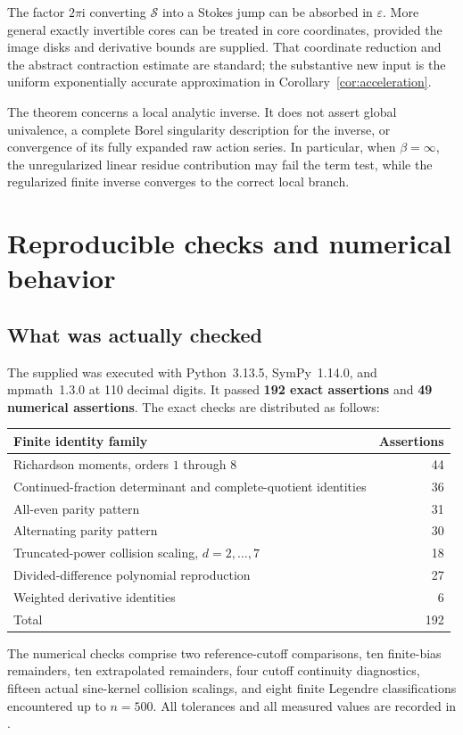 \documentclass[11pt,a4paper]{article}
\numberwithin{equation}{section}
\theoremstyle{definition}
\theoremstyle{remark}
\newcommand{\ii}{\mathrm i}
\newcommand{\Ssum}{\mathcal S}
\begin{document}
The factor $2\pi\ii$ converting $\Ssum$ into a Stokes jump can be
absorbed in $\varepsilon$. More general exactly invertible cores can
be treated in core coordinates, provided the image disks and derivative
bounds are supplied. That coordinate reduction and the abstract
contraction estimate are standard; the substantive new input is the
uniform exponentially accurate approximation in
Corollary~\ref{cor:acceleration}.

The theorem concerns a local analytic inverse. It does not assert global
univalence, a complete Borel singularity description for the inverse,
or convergence of its fully expanded raw action series. In particular,
when $\beta=\infty$, the unregularized linear residue contribution may
fail the term test, while the regularized finite inverse converges to
the correct local branch.

\section{Reproducible checks and numerical behavior}
\label{sec:verification}

\subsection{What was actually checked}
The supplied  was executed with Python~3.13.5,
SymPy~1.14.0, and mpmath~1.3.0 at 110 decimal digits. It passed
\textbf{192 exact assertions} and \textbf{49 numerical assertions}.
The exact checks are distributed as follows:
\begin{center}
\begin{tabular}{lr}
\toprule
Finite identity family & Assertions\\
\midrule
Richardson moments, orders $1$ through $8$ &44\\
Continued-fraction determinant and complete-quotient identities &36\\
All-even parity pattern &31\\
Alternating parity pattern &30\\
Truncated-power collision scaling, $d=2,\ldots,7$ &18\\
Divided-difference polynomial reproduction &27\\
Weighted derivative identities &6\\
\midrule
Total &192\\
\bottomrule
\end{tabular}
\end{center}
The numerical checks comprise two reference-cutoff comparisons, ten
finite-bias remainders, ten extrapolated remainders, four cutoff
continuity diagnostics, fifteen actual sine-kernel collision scalings,
and eight finite Legendre classifications encountered up to $n=500$.
All tolerances and all measured values are recorded in
.
\end{document}

